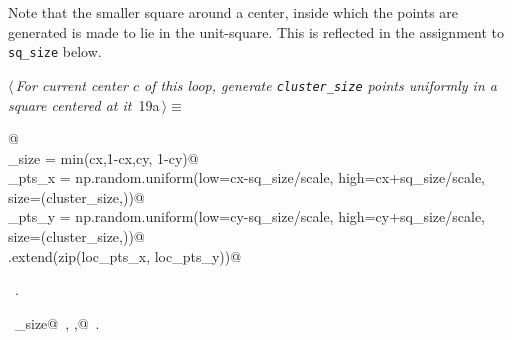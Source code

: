 \documentclass[11.5pt]{report}
\begin{document}
\vspace{-0.8cm} \newchunk Note that the smaller square around a center, inside which the points are generated is made to lie 
in the unit-square. This is reflected in the assignment to \verb|sq_size| below. 
\begin{flushleft} \small
\begin{minipage}{\linewidth}\label{scrap20}\raggedright\small
{} $\langle\,${\itshape For current center $c$ of this loop, generate \verb|cluster_size| points uniformly in a square centered at it}\nobreak\ {\footnotesize {19a}}$\,\rangle\equiv$
\vspace{-1ex}
\begin{list}{}{} \item
\mbox{}\verb@   @\\
\mbox{}\verb@sq_size      = min(cx,1-cx,cy, 1-cy)@\\
\mbox{}\verb@loc_pts_x    = np.random.uniform(low=cx-sq_size/scale, high=cx+sq_size/scale, size=(cluster_size,))@\\
\mbox{}\verb@loc_pts_y    = np.random.uniform(low=cy-sq_size/scale, high=cy+sq_size/scale, size=(cluster_size,))@\\
\mbox{}\verb@points.extend(zip(loc_pts_x, loc_pts_y))@\\
\mbox{}\verb@@{\NWsep}
\end{list}
\vspace{-1.5ex}
\footnotesize
\begin{list}{}{\setlength{\itemsep}{-\parsep}\setlength{\itemindent}{-\leftmargin}}
\item \NWtxtMacroRefIn\ .
\item \NWtxtIdentsUsed\nobreak\  \verb@cluster_size@\nobreak\ , \verb@scale,@\nobreak\ .
\item{}
\end{list}
\end{minipage}\vspace{4ex}
\end{flushleft}
\end{document}
